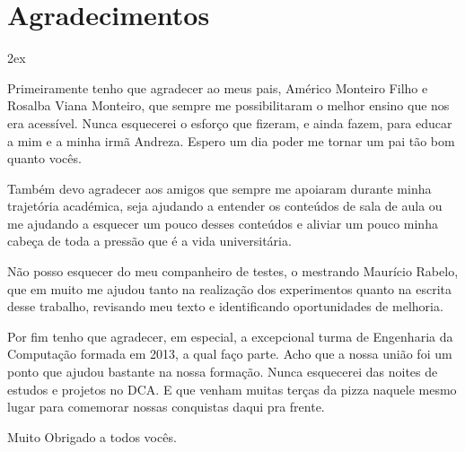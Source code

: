 %
%


\chapter*{Agradecimentos}
\thispagestyle{empty}

\begin{trivlist}  \itemsep 2ex

\item Primeiramente tenho que agradecer ao meus pais, Américo Monteiro Filho e Rosalba Viana Monteiro, que sempre me possibilitaram o melhor ensino que nos era acessível. Nunca esquecerei o esforço que fizeram, e ainda fazem, para educar a mim e a minha irmã Andreza. Espero um dia poder me tornar um pai tão bom quanto vocês.
  
\item Também devo agradecer aos amigos que sempre me apoiaram durante minha trajetória académica, seja ajudando a entender os conteúdos de sala de aula ou me ajudando a esquecer um pouco desses conteúdos e aliviar um pouco minha cabeça de toda a pressão que é a vida universitária.

\item Não posso esquecer do meu companheiro de testes, o mestrando Maurício Rabelo, que em muito me ajudou tanto na realização dos experimentos quanto na escrita desse trabalho, revisando meu texto e identificando oportunidades de melhoria.

\item Por fim tenho que agradecer, em especial, a excepcional turma de Engenharia da Computação formada em 2013, a qual faço parte. Acho que a nossa união foi um ponto que ajudou bastante na nossa formação. Nunca esquecerei das noites de estudos e projetos no DCA. E que venham muitas terças da pizza naquele mesmo lugar para comemorar nossas conquistas daqui pra frente.

\item Muito Obrigado a todos vocês.

\end{trivlist}






